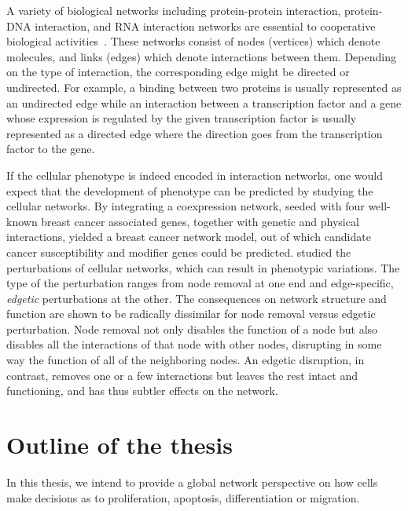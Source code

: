 
A variety of biological networks including protein-protein interaction, protein-DNA interaction, and RNA interaction networks are essential to cooperative biological activities~\citep{Zhu2007a}. These networks consist of nodes (vertices) which denote molecules, and links (edges) which denote interactions between them. Depending on the type of interaction, the corresponding edge might be directed or undirected. For example, a binding between two proteins is usually represented as an undirected edge while an interaction between a transcription factor and a gene whose expression is regulated by the given transcription factor is usually represented as a directed edge where the direction goes from the transcription factor to the gene.

If the cellular phenotype is indeed encoded in interaction 
networks, one would expect that the development of 
phenotype can be predicted by studying the cellular
networks. By integrating a coexpression network, seeded with four well-known breast cancer
associated genes, together with genetic and physical interactions, \cite{Pujana2007} yielded a breast cancer network model, out of which candidate cancer susceptibility and modifier genes could be predicted.
\cite{Zhong2009} studied the
perturbations of cellular networks, which can result in phenotypic variations.
The type of the perturbation ranges from node removal at one end and edge-specific,
\emph{edgetic} perturbations at the other. The
consequences on network structure and function are shown
to be radically dissimilar for node removal versus edgetic perturbation. Node removal not only disables the function of a node but
also disables all the interactions of that node with other nodes,
disrupting in some way the function of all of the neighboring nodes. An edgetic disruption, in contrast, removes one or a few interactions
but leaves the rest intact and functioning, and has thus 
subtler effects
on the network. 

\section{Outline of the thesis}
In this thesis, we intend to provide a global network
perspective on how cells make decisions as to proliferation,
apoptosis, differentiation or migration.

